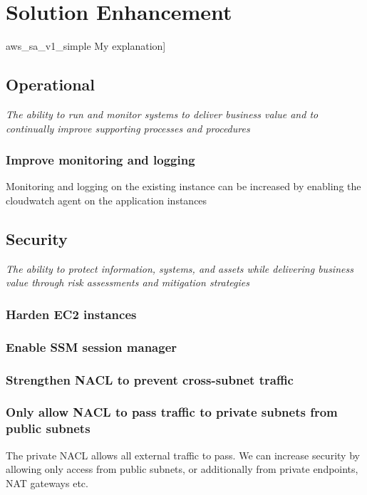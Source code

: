 \section{Solution Enhancement}

\imagefigsingle
{aws_sa_v1_simple}
{My explanation]}

\subsection{Operational}

\textit{The ability to run and monitor systems to deliver business value and to continually improve supporting processes and procedures}

\subsubsection{Improve monitoring and logging}

Monitoring and logging on the existing instance can be increased by enabling the cloudwatch agent on the application instances


\subsection{Security}

\textit{The ability to protect information, systems, and assets while delivering business value through risk assessments and mitigation strategies}

\subsubsection{Harden EC2 instances}

\subsubsection{Enable SSM session manager}

\subsubsection{Strengthen NACL to prevent cross-subnet traffic}

\subsubsection{Only allow NACL to pass traffic to private subnets from public subnets}

The private NACL allows all external traffic to pass. We can increase security by allowing only access from public subnets, or additionally from private endpoints, NAT gateways etc.

